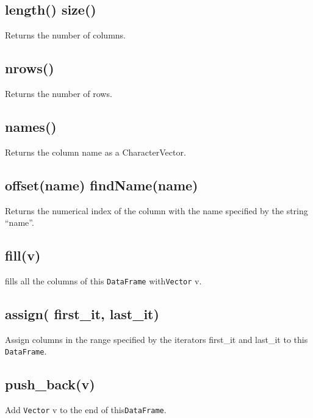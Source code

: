 \documentclass[
]{book}
\begin{document}
\hypertarget{length-size}{%
\subsection{length() size()}\label{length-size}}

Returns the number of columns.

\hypertarget{nrows}{%
\subsection{nrows()}\label{nrows}}

Returns the number of rows.

\hypertarget{names}{%
\subsection{names()}\label{names}}

Returns the column name as a CharacterVector.

\hypertarget{offsetname-findnamename}{%
\subsection{offset(name) findName(name)}\label{offsetname-findnamename}}

Returns the numerical index of the column with the name specified by the string ``name''.

\hypertarget{fillv}{%
\subsection{fill(v)}\label{fillv}}

fills all the columns of this \texttt{DataFrame} with\texttt{Vector} v.

\hypertarget{assign-first_it-last_it}{%
\subsection{assign( first\_it, last\_it)}\label{assign-first_it-last_it}}

Assign columns in the range specified by the iterators first\_it and last\_it to this \texttt{DataFrame}.

\hypertarget{push_backv}{%
\subsection{push\_back(v)}\label{push_backv}}

Add \texttt{Vector} v to the end of this\texttt{DataFrame}.
\end{document}
